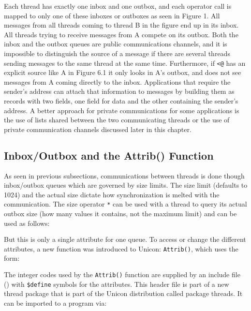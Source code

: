 Each thread has exactly one inbox and one outbox, and each operator call is
mapped to only one of these inboxes or outboxes as seen in {\color{red}
Figure 1}. All messages from all threads coming to thread B in the figure
end up in its inbox. All threads trying to receive messages from A compete
on its outbox. Both the inbox and the outbox queues are public
communications channels, and it is impossible to distinguish the source of
a message if there are several threads sending messages to the same thread
at the same time. Furthermore, if \texttt{<@} has an explicit source like A in
{\color{red} Figure 6.1} it only looks in A's outbox, and does not see messages from A
coming directly to the inbox. Applications that require the sender's
address can attach that information to messages by building them as records
with two fields, one field for data and the other containing the sender's
address. A better approach for private communications for some applications
is the use of lists shared between the two communicating threads or the use
of private communication channels discussed later in this chapter.

\subsection{Inbox/Outbox and the Attrib() Function}

As seen in previous subsections, communications between threads is done though
inbox/outbox queues which are governed by size limits. The size limit (defaults to 1024)
and the actual size dictate how synchronization is melted with the communication.
The size operator \texttt{*} can be used with a thread to query its actual outbox size
(how many values it contains, not the maximum limit) and can be used as follows:


\noindent
But this is only a single attribute for one queue. To access or change the
different attributes, a new function was introduced to Unicon:
\texttt{Attrib()}, which uses the form:


\noindent
The integer codes used by the \texttt{Attrib()} function are supplied by an
include file () with \texttt{\$define} symbols for the
attributes. This header file is part of a new thread package that is part
of the Unicon distribution called package threads.  It can be imported to a
program via:

